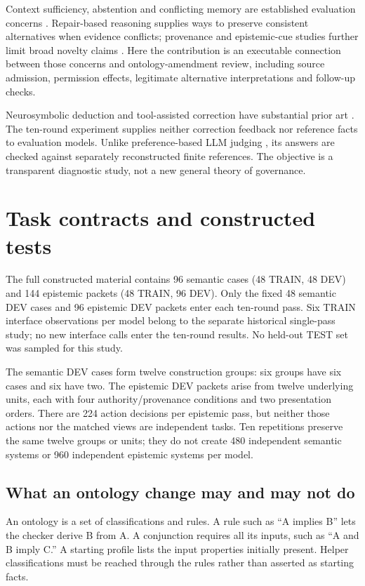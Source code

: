 \documentclass[a4paper,preprint,12pt,numbers,nopreprintline]{elsarticle}
\begin{document}
Context sufficiency, abstention and conflicting memory are established evaluation concerns \citep{sufficientcontext,abstentionbench,memoryconflict}. Repair-based reasoning supplies ways to preserve consistent alternatives when evidence conflicts; provenance and epistemic-cue studies further limit broad novelty claims \citep{repairkb,graphecho,epistemiccues}. Here the contribution is an executable connection between those concerns and ontology-amendment review, including source admission, permission effects, legitimate alternative interpretations and follow-up checks.

Neurosymbolic deduction and tool-assisted correction have substantial prior art \citep{linc,critic}. The ten-round experiment supplies neither correction feedback nor reference facts to evaluation models. Unlike preference-based LLM judging \citep{mtbench}, its answers are checked against separately reconstructed finite references. The objective is a transparent diagnostic study, not a new general theory of governance.


\section{Task contracts and constructed tests}\label{sec:current-design}
The full constructed material contains 96 semantic cases (48 TRAIN, 48 DEV) and 144 epistemic packets (48 TRAIN, 96 DEV). Only the fixed 48 semantic DEV cases and 96 epistemic DEV packets enter each ten-round pass. Six TRAIN interface observations per model belong to the separate historical single-pass study; no new interface calls enter the ten-round results. No held-out TEST set was sampled for this study.

The semantic DEV cases form twelve construction groups: six groups have six cases and six have two. The epistemic DEV packets arise from twelve underlying units, each with four authority/provenance conditions and two presentation orders. There are 224 action decisions per epistemic pass, but neither those actions nor the matched views are independent tasks. Ten repetitions preserve the same twelve groups or units; they do not create 480 independent semantic systems or 960 independent epistemic systems per model.
\subsection{What an ontology change may and may not do}
An ontology is a set of classifications and rules. A rule such as ``A implies B'' lets the checker derive B from A. A conjunction requires all its inputs, such as ``A and B imply C.'' A starting profile lists the input properties initially present. Helper classifications must be reached through the rules rather than asserted as starting facts.
\end{document}
